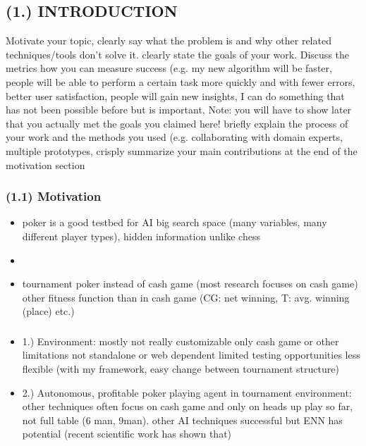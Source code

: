 \subsection{(1.) INTRODUCTION}
Motivate your topic, clearly say what the problem is and why other related techniques/tools don't solve it. clearly state the goals of your work. Discuss the metrics how you can measure success  (e.g. my new algorithm will be faster, people will be able to perform a certain task more quickly and with fewer errors, better user satisfaction, people will gain new insights, I can do something that has not been possible before but is important, Note: you will have to show later that you actually met the goals you claimed
here! briefly explain the process of your work and the methods you used (e.g.
collaborating with domain experts, multiple prototypes, crisply summarize your main contributions at the end of the motivation section
\subsubsection{(1.1) Motivation}
\begin{itemize}
\item poker is a good testbed for AI
\subitem big search space (many variables, many different player types), hidden information unlike chess
\item {}
\item tournament poker instead of cash game (most research focuses on cash game)
\subitem other fitness function than in cash game (CG: net winning, T: avg. winning (place) etc.)
\end{itemize}
\subsubsection{}
\begin{itemize}
\item 1.) Environment: 
\subitem mostly not really customizable
\subitem only cash game or other limitations
\subitem not standalone or web dependent
\subitem limited testing opportunities
\subitem less flexible (with my framework, easy change between tournament structure)
\item 2.) Autonomous, profitable poker playing agent in tournament environment:
\subitem  other techniques often focus on cash game and only on heads up play so far, not full table (6 man, 9man).
\subitem other AI techniques successful but ENN has potential (recent scientific work has shown that)
\end{itemize}
